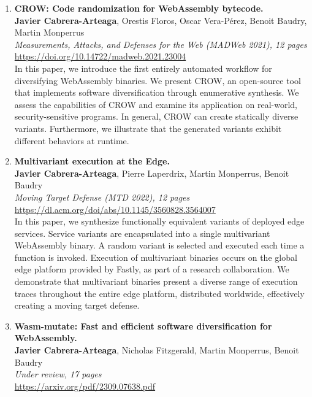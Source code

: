 \begin{enumerate}[label={\textbf{P\arabic*}:}, ref={P\arabic*}]
	\item \label{crowpaper} \textbf{CROW: Code randomization for WebAssembly bytecode.} \\ 
	\textbf{Javier Cabrera-Arteaga}, Orestis Floros, Oscar Vera-Pérez, Benoit Baudry, Martin Monperrus\\
	\textit{ Measurements, Attacks, and Defenses for the Web (MADWeb 2021), 12 pages} \\
	\url{https://doi.org/10.14722/madweb.2021.23004} \\
	
	 In this paper, we introduce the first entirely automated workflow for diversifying WebAssembly binaries. 
	We present CROW, an open-source tool that implements software diversification through enumerative synthesis. 
	We assess the capabilities of CROW and examine its application on real-world, security-sensitive programs.
	In general, CROW can create statically diverse variants. 
	Furthermore, we illustrate that the generated variants exhibit different behaviors at runtime.

	
	
	\item \label{mewepaper} \textbf{Multivariant execution at the Edge. } \\
	\textbf{Javier Cabrera-Arteaga}, Pierre Laperdrix, Martin Monperrus, Benoit Baudry\\
    \textit{Moving Target Defense (MTD 2022), 12 pages} \\
    \url{https://dl.acm.org/doi/abs/10.1145/3560828.3564007} \\

	In this paper, we synthesize functionally equivalent variants of deployed edge services. 
	Service variants are encapsulated into a single multivariant WebAssembly binary. 
	A random variant is selected and executed each time a function is invoked.
	Execution of multivariant binaries occurs on the global edge platform provided by Fastly, as part of a research collaboration. 
	We demonstrate that multivariant binaries present a diverse range of execution traces throughout the entire edge platform, distributed worldwide, effectively creating a moving target defense.

	
	\item \label{wasmmutatepaper}\textbf{Wasm-mutate: Fast and efficient software diversification for WebAssembly. }\\ 
	\textbf{Javier Cabrera-Arteaga}, Nicholas Fitzgerald, Martin Monperrus, Benoit Baudry\\
	\textit{Under review, 17 pages} \\
	\url{https://arxiv.org/pdf/2309.07638.pdf}


\end{enumerate}
